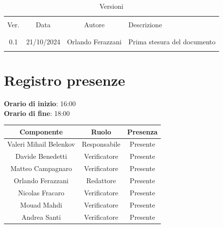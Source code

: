 \documentclass[italian, 12pt]{article}
\begin{document}
\pagestyle{mystyle}


\begin{table}[!h]
	\caption{Versioni}
	\begin{center}
		\begin{tabular}{ c c c p{9cm}}
			\hline \\[-2ex]
			Ver. & Data & Autore & Descrizione \\
			\\[-2ex] \hline \\[-1.5ex]
			0.1 & 21/10/2024 & Orlando Ferazzani& Prima stesura del documento\\
			\\[-1.5ex] \hline
		\end{tabular}
	\end{center}
\end{table}


\tableofcontents
\newpage


\section{Registro presenze}

\textbf{Orario di inizio}: 16:00\\
\textbf{Orario di fine}: 18:00\\


\begin{flushleft}
	\begin{table}[!h]
	\begin{tabular}{ |c|c|c| } 
		\hline
		\textbf{Componente} & \textbf{Ruolo} & \textbf{Presenza} \\
  \hline 
		Valeri Mihail Belenkov & Responsabile & Presente \\ 
		Davide Benedetti 	& Verificatore & Presente \\
		Matteo Campagnaro	& Verificatore & Presente \\
		Orlando Ferazzani 	& Redattore & Presente \\
		Nicolas Fracaro 	& Verificatore & Presente \\
		Mouad Mahdi		    & Verificatore & Presente \\ 
		Andrea Santi 	    & Verificatore & Presente \\
		\hline
	\end{tabular}
	\end{table}
	\end{flushleft}
\end{document}
